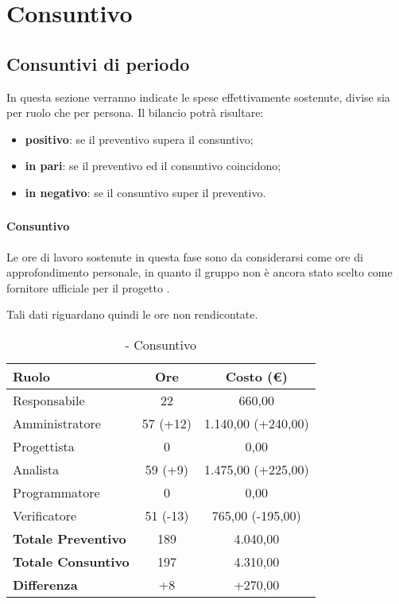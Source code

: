 \documentclass[./PianoDiProgetto.tex]{subfiles}
\begin{document}
\section{Consuntivo}
\subsection{Consuntivi di periodo}
In questa sezione verranno indicate le spese effettivamente sostenute, divise sia
per ruolo che per persona. Il bilancio potrà risultare:
\begin{itemize}
  \item \textbf{positivo}: se il preventivo supera il consuntivo;
  \item \textbf{in pari}: se il preventivo ed il consuntivo coincidono;
  \item \textbf{in negativo}: se il consuntivo super il preventivo.
\end{itemize}
\subsubsection{\PerAR}
	\paragraph{Consuntivo}
Le ore di lavoro sostenute in questa fase sono da considerarsi come ore di approfondimento personale, in quanto il gruppo \GRUPPO{} non è ancora stato scelto come fornitore ufficiale per il progetto \PROGETTO.
		
		Tali dati riguardano quindi le ore non rendicontate.

\begin{table}[h]
		\centering
		\begin{tabular}{l * {2}{c}}
			\toprule
			\textbf{Ruolo} & \textbf{Ore} & \textbf{Costo (\euro{})} \\
			\midrule
			Responsabile &	22 & 660,00 \\
			Amministratore & 57 (+12) & 1.140,00 (+240,00)\\
			Progettista & 0 & 0,00 \\
			Analista & 59 (+9) & 1.475,00 (+225,00)\\
			Programmatore & 0 & 0,00 \\
			Verificatore & 51 (-13) & 765,00 (-195,00)\\
			\midrule
			\textbf{Totale Preventivo} & 189
 & 4.040,00
 \\		
			\textbf{Totale Consuntivo} & 197 & 4.310,00
 \\
			\midrule
			\textbf{Differenza} & +8 & +270,00 \\
			\bottomrule
		\end{tabular}
		\caption{\PerAR{} - Consuntivo}
		\label{tab:consuntivoA}
		
	\end{table}		
		
\end{document}
